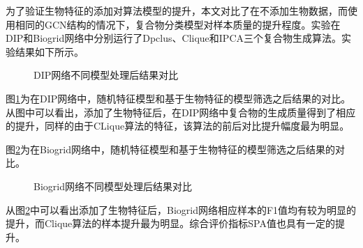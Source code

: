为了验证生物特征的添加对算法模型的提升，本文对比了在不添加生物数据，而使用相同的GCN结构的情况下，复合物分类模型对样本质量的提升程度。实验在DIP和Biogrid网络中分别运行了Dpclus、Clique和IPCA三个复合物生成算法。实验结果如下所示。
\begin{figure}[htbp]
    \centering
    \vskip0.2cm
    \caption{DIP网络不同模型处理后结果对比}
    \label{fig:result/DIP/edge}
\end{figure}

图\ref{fig:result/DIP/edge}为在DIP网络中，随机特征模型和基于生物特征的模型筛选之后结果的对比。
从图中可以看出，添加了生物特征后，在DIP网络中复合物的生成质量得到了相应的提升，同样的由于CLique算法的特征，该算法的前后对比提升幅度最为明显。

图\ref{fig:result/Biogrid/edge}为在Biogrid网络中，随机特征模型和基于生物特征的模型筛选之后结果的对比。
\begin{figure}[htbp]
    \centering
    \vskip0.2cm
    \caption{Biogrid网络不同模型处理后结果对比}
    \label{fig:result/Biogrid/edge}
\end{figure}
从图\ref{fig:result/Biogrid/edge}中可以看出添加了生物特征后，Biogrid网络相应样本的F1值均有较为明显的提升，而Clique算法的样本提升最为明显。综合评价指标SPA值也具有一定的提升。


